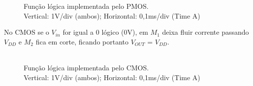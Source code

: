 \documentclass[pdftex,12pt,a4paper]{report}
\begin{document}
\begin{figure}[h]
  \centerline{}
  \caption{Função lógica implementada pelo PMOS. \\Vertical: 1V/div (ambos); Horizontal: 0,1ms/div (Time A)}\label{cmos}
\end{figure}

No CMOS se o $V_{in}$ for igual a 0 lógico (0V), em $M_1$ deixa fluir corrente passando $V_{DD}$ e $M_2$ fica em corte, ficando portanto $V_{OUT}$ = $V_{DD}$.

\begin{figure}[h]
  \centerline{}
  \caption{\\Função lógica implementada pelo CMOS. \\Vertical: 1V/div (ambos); Horizontal: 0,1ms/div (Time A)}\label{cmos}
\end{figure}

\newpage
\end{document}
